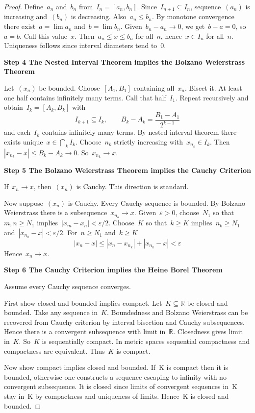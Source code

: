 \documentclass[12pt,a4paper,draft]{article}  %
\theoremstyle{definition}
\numberwithin{equation}{section}
\newcommand{\RR}{\mathbb{R}}
\begin{document}
\begin{proof}
Define~$a_n$ and~$b_n$ from~$I_n=[a_n,b_n]$.
Since~$I_{n+1}\subseteq I_n$, sequence~$(a_n)$ is increasing and~$(b_n)$ is decreasing.
Also~$a_n\le b_n$.
By monotone convergence there exist~$a=\lim a_n$ and~$b=\lim b_n$.
Given~$b_n-a_n\to0$, we get~$b-a=0$, so~$a=b$.
Call this value~$x$.
Then~$a_n\le x\le b_n$ for all~$n$, hence~$x\in I_n$ for all~$n$.
Uniqueness follows since interval diameters tend to~$0$.

\textbf{Step 4  The Nested Interval Theorem implies the Bolzano Weierstrass Theorem}

Let~$(x_n)$ be bounded.
Choose~$[A_1,B_1]$ containing all~$x_n$.
Bisect it.
At least one half contains infinitely many terms.
Call that half~$I_1$.
Repeat recursively and obtain~$I_k=[A_k,B_k]$ with
\[
I_{k+1}\subseteq I_k,\qquad B_k-A_k=\frac{B_1-A_1}{2^{k-1}}
\]
and each~$I_k$ contains infinitely many terms.
By nested interval theorem there exists unique~$x\in\bigcap_k I_k$.
Choose~$n_k$ strictly increasing with~$x_{n_k}\in I_k$.
Then~$|x_{n_k}-x|\le B_k-A_k\to0$.
So~$x_{n_k}\to x$.

\textbf{Step 5  The Bolzano Weierstrass Theorem implies the Cauchy Criterion}

If~$x_n\to x$, then~$(x_n)$ is Cauchy.
This direction is standard.

Now suppose~$(x_n)$ is Cauchy.
Every Cauchy sequence is bounded.
By Bolzano Weierstrass there is a subsequence~$x_{n_k}\to x$.
Given~$\varepsilon>0$, choose~$N_1$ so that~$m,n\ge N_1$ implies~$|x_m-x_n|<\varepsilon/2$.
Choose~$K$ so that~$k\ge K$ implies~$n_k\ge N_1$ and~$|x_{n_k}-x|<\varepsilon/2$.
For~$n\ge N_1$ and~$k\ge K$
\[
|x_n-x|
\le
|x_n-x_{n_k}|+|x_{n_k}-x|
<
\varepsilon
\]
Hence~$x_n\to x$.

\textbf{Step 6  The Cauchy Criterion implies the Heine Borel Theorem}

Assume every Cauchy sequence converges.

First show closed and bounded implies compact.
Let~$K\subseteq\RR$ be closed and bounded.
Take any sequence in~$K$.
Boundedness and Bolzano Weierstrass can be recovered from Cauchy criterion by interval bisection and Cauchy subsequences.
Hence there is a convergent subsequence with limit in~$\RR$.
Closedness gives limit in~$K$.
So~$K$ is sequentially compact.
In metric spaces sequential compactness and compactness are equivalent.
Thus~$K$ is compact.

Now show compact implies closed and bounded.
If~K is compact then it is bounded, otherwise one constructs a sequence escaping to infinity with no convergent subsequence.
It is closed since limits of convergent sequences in~K stay in~K by compactness and uniqueness of limits.
Hence~K is closed and bounded.


\end{proof}
\end{document}
